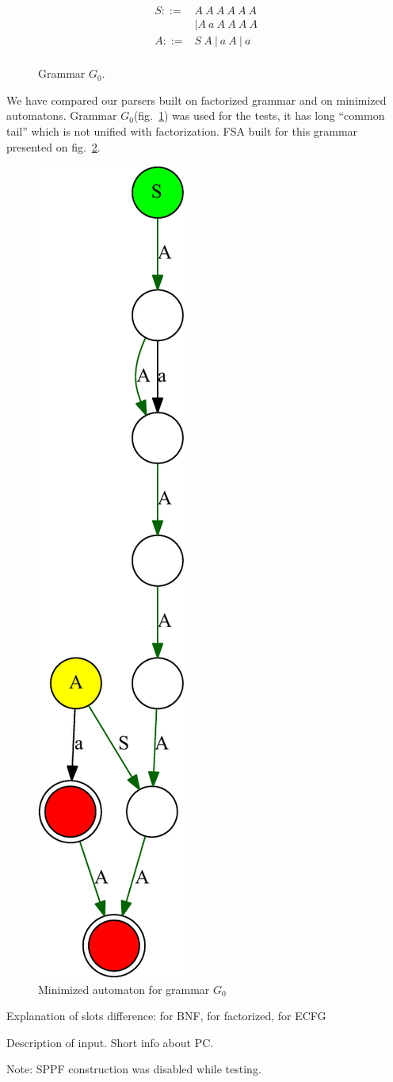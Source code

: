 \documentclass[runningheads,a4paper]{llncs}
\begin{document}
\begin{figure}[h]
$$
\begin{array}{crcl}
S ::=& A\ A\ A\ A\ A\ A \\
     &|A\ a\ A\ A\ A\ A \\
A ::=& S\ A\ |\ a\ A\ |\ a \\
\end{array}
$$
\caption{Grammar $G_0$.}
\label{testGrammar}
\end{figure}

We have compared our parsers built on factorized grammar and on minimized automatons.
Grammar $G_0$(fig.~\ref{testGrammar}) was used for the tests,
it has long ``common tail'' which is not unified with factorization.
FSA built for this grammar presented on fig.~\ref{dfa}.

\begin{figure}
\centering
\includegraphics[height=0.95\textwidth,angle=90]{pictures/minimizedDFA.pdf}
\caption{\label{dfa}Minimized automaton for grammar $G_0$}
\end{figure}

Explanation of slots difference: for BNF, for factorized, for ECFG

Description of input. 
Short info about PC.

Note: SPPF construction was disabled while testing.
\end{document}
